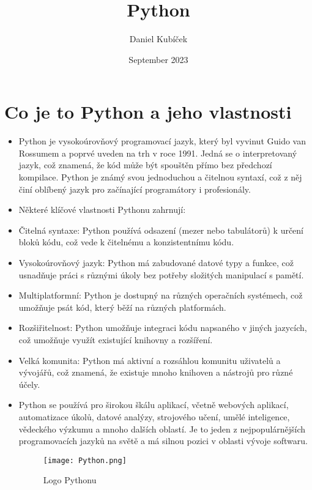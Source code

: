\documentclass[12pt,a4paper]{article}
\title{Python}
\author{Daniel Kubíček}
\date{September 2023}
\begin{document}
\maketitle
\tableofcontents
\section{Co je to Python a jeho vlastnosti}
\begin{itemize}
\normalsize
    \item Python je vysokoúrovňový programovací jazyk, který byl vyvinut Guido van Rossumem a poprvé uveden na trh v roce 1991. Jedná se o interpretovaný jazyk, což znamená, že kód může být spouštěn přímo bez předchozí kompilace. Python je známý svou jednoduchou a čitelnou syntaxí, což z něj činí oblíbený jazyk pro začínající programátory i profesionály.
    \item Některé klíčové vlastnosti Pythonu zahrnují:
     \item Čitelná syntaxe: Python používá odsazení (mezer nebo tabulátorů) k určení bloků kódu, což vede k čitelnému a konzistentnímu kódu.
     \item Vysokoúrovňový jazyk: Python má zabudované datové typy a funkce, což usnadňuje práci s různými úkoly bez potřeby složitých manipulací s pamětí.
     \item Multiplatformní: Python je dostupný na různých operačních systémech, což umožňuje psát kód, který běží na různých platformách.
     \item Rozšiřitelnost: Python umožňuje integraci kódu napsaného v jiných jazycích, což umožňuje využít existující knihovny a rozšíření.
     \item Velká komunita: Python má aktivní a rozsáhlou komunitu uživatelů a vývojářů, což znamená, že existuje mnoho knihoven a nástrojů pro různé účely.
     \item Python se používá pro širokou škálu aplikací, včetně webových aplikací, automatizace úkolů, datové analýzy, strojového učení, umělé inteligence, vědeckého výzkumu a mnoho dalších oblastí. Je to jeden z nejpopulárnějších programovacích jazyků na světě a má silnou pozici v oblasti vývoje softwaru.
    
    \begin{figure}[h]
    \centering
    \texttt{[image: Python.png]}
    \caption{Logo Pythonu}
    \end{figure}
   
\end{itemize}
\end{document}
